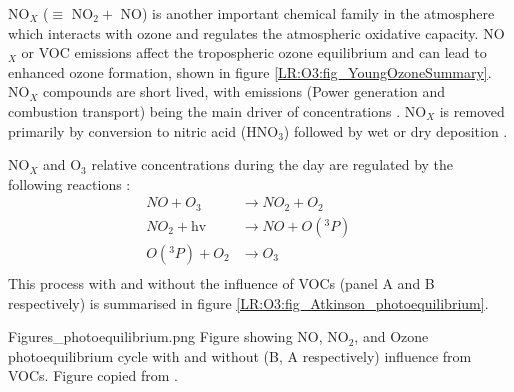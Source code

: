     NO$_X$ ($\equiv $ NO$_2 +$ NO) is another important chemical family in the atmosphere which interacts with ozone and regulates the atmospheric oxidative capacity.
    NO$_X$ or VOC emissions affect the tropospheric ozone equilibrium and can lead to enhanced ozone formation, shown in figure \ref{LR:O3:fig_YoungOzoneSummary}.
    NO$_X$ compounds are short lived, with emissions (Power generation and combustion transport) being the main driver of concentrations \parencite{Delmas1997}.
    NO$_X$ is removed primarily by conversion to nitric acid (HNO$_3$) followed by wet or dry deposition \parencite{Ayers2006}.
    
    NO$_X$ and O$_3$ relative concentrations during the day are regulated by the following reactions \parencite{Sillman1999,Atkinson2000}:
    \begin{equation}
      \begin{aligned}
        NO + O_3         & \to NO_2 + O_2      && \\%
        NO_2 + \text{hv} & \to NO + O({}^3P)   && \\%
        O({}^3P) + O_2   & \to O_3 			 && \\%
      \end{aligned}
      \label{LR:Atmos:Chem:eqn_NOandO3}
    \end{equation}
    This process with and without the influence of VOCs (panel A and B respectively) is summarised in figure \ref{LR:O3:fig_Atkinson_photoequilibrium}.
    
      {Figures_photoequilibrium.png}
      {Figure showing NO, NO$_2$, and Ozone photoequilibrium cycle with and without (B, A respectively) influence from VOCs. Figure copied from \textcite{Atkinson2000}.}
      {\label{LR:O3:fig_Atkinson_photoequilibrium}}
    
    
    
  
